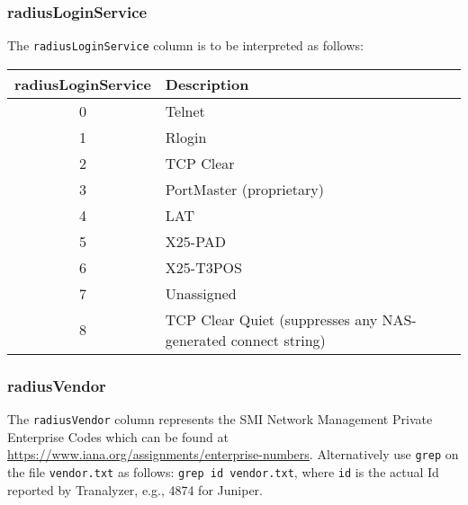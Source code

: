 \documentclass[documentation]{subfiles}
\begin{document}
\subsubsection{radiusLoginService}\label{radiusLoginService}
The {\tt radiusLoginService} column is to be interpreted as follows:
\begin{longtable}{cl}
    \toprule
    {\bf radiusLoginService} & {\bf Description}\\
    \midrule\endhead%
    0 & Telnet\\
    1 & Rlogin\\
    2 & TCP Clear\\
    3 & PortMaster (proprietary)\\
    4 & LAT\\
    5 & X25-PAD\\
    6 & X25-T3POS\\
    7 & Unassigned\\
    8 & TCP Clear Quiet (suppresses any NAS-generated connect string)\\
    \bottomrule
\end{longtable}

\subsubsection{radiusVendor}\label{radiusVendor}
The {\tt radiusVendor} column represents the SMI Network Management Private Enterprise Codes which can be found at \url{https://www.iana.org/assignments/enterprise-numbers}.
Alternatively use {\tt grep} on the file {\tt vendor.txt} as follows: {\tt grep id vendor.txt}, where {\tt id} is the actual Id reported by Tranalyzer, e.g., 4874 for Juniper.
\end{document}
